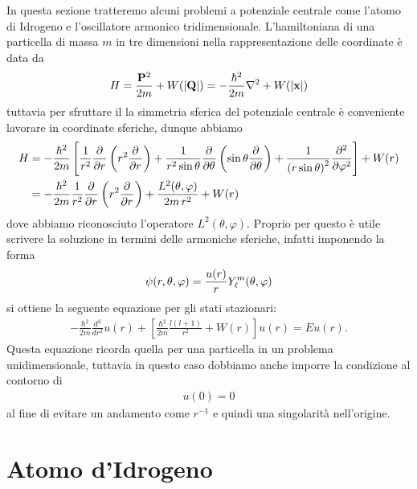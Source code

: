 In questa sezione tratteremo alcuni problemi a potenziale centrale come l'atomo di Idrogeno e l'oscillatore armonico tridimensionale.
L'hamiltoniana di una particella di massa $ m $ in tre dimensioni nella rappresentazione delle coordinate è data da
\begin{align*}
  H = \frac{\mathbf{P}^2}{2m} + W(\left|{\mathbf{Q}}\right|) = - \frac{\hbar^2}{2m} \nabla^2 + W(\left|{\mathbf{x}}\right|)
\end{align*}
tuttavia per sfruttare il la simmetria sferica del potenziale centrale è conveniente lavorare in coordinate sferiche, dunque abbiamo 
\begin{align*}
  H &= - \frac{\hbar^2}{2m} \left[ \frac1{r^2} \der{}{r} \left( r^2 \der{}r \right) 
  + \frac1{r^2 \sin\theta} \der{}{\theta} \left( \sin\theta \der{}{\theta} \right) 
  + \frac1{\left( r \sin\theta \right)^2} \der[2]{}{\varphi}\right]  + W(r)
  \\
  &= - \frac{\hbar^2}{2m} \frac1{r^2} \der{}{r} \left( r^2 \der{}r \right) + \frac{L^2(\theta, \varphi)}{2m\,r^2} + W(r)
\end{align*}
dove abbiamo riconosciuto l'operatore $ L^2(\theta, \varphi) $. Proprio per questo è utile scrivere la soluzione in termini delle armoniche sferiche, 
infatti imponendo la forma 
\begin{align*}
  \psi(r,\theta, \varphi) = \frac{u(r)}{r} Y_\l^m(\theta, \varphi)
\end{align*}
si ottiene la seguente equazione per gli stati stazionari:
\begin{align*}
  - \frac{\hbar^2}{2m} \frac{d^2}{dr^2} u(r) + \left[ \frac{\hbar^2}{2m} \frac{l(l+1)}{r^2} + W(r)\right] u(r) = E u(r).
\end{align*}
Questa equazione ricorda quella per una particella in un problema unidimensionale, tuttavia in questo caso dobbiamo anche imporre la condizione al 
contorno di 
\begin{align*}
  u(0) = 0
\end{align*}
al fine di evitare un andamento come $ r^{-1} $ e quindi una singolarità nell'origine.


\section{Atomo d'Idrogeno}

